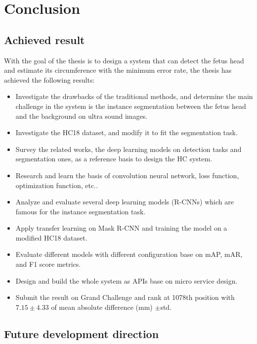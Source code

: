 \chapter{Conclusion}
\section{Achieved result}
\noindent
	
	With the goal of the thesis is to design a system that can detect the fetus head and estimate its circumference with the minimum error rate, the thesis has achieved the following results:
	
	\begin{itemize}
		\item Investigate the drawbacks of the traditional methods, and determine the main challenge in the system is the instance segmentation between the fetus head and the background on ultra sound images.
		
		\item Investigate the HC18 dataset, and modify it to fit the segmentation task.
		
		\item Survey the related works, the deep learning models on detection tasks and segmentation ones, as a reference basis to design the HC system.
		
		\item Research and learn the basis of convolution neural network, loss function, optimization function, etc..
		
		\item Analyze and evaluate several deep learning models (R-CNNs) which are famous for the instance segmentation task. 
		
		\item Apply transfer learning on Mask R-CNN and training the model on a modified HC18 dataset.
		
		\item Evaluate different models with different configuration base on mAP, mAR, and F1 score metrics.
		
		\item Design and build the whole system as APIs base on micro service design.
		
		\item Submit the result on Grand Challenge and rank at 1078th position with $7.15 \pm 4.33$ of mean absolute difference (mm) $\pm$std.
	\end{itemize}

\section{Future development direction}
\noindent
	
